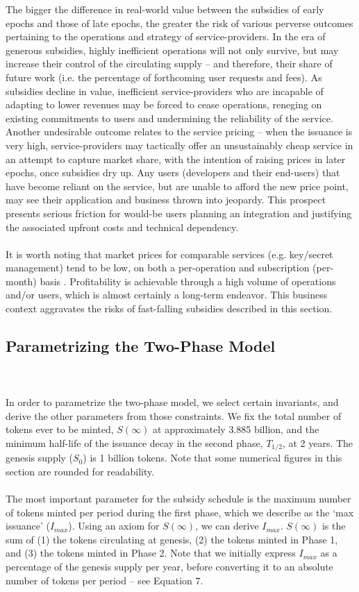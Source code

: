 \documentclass[longbibliography,nofootinbib]{revtex4-1}
\begin{document}
The bigger the difference in real-world value between the subsidies of early epochs and those of late epochs, the greater the risk of various perverse outcomes pertaining to the operations and strategy of service-providers. In the era of generous subsidies, highly inefficient operations will not only survive, but may increase their control of the circulating supply – and therefore, their share of future work (i.e. the percentage of forthcoming user requests and fees). As subsidies decline in value, inefficient service-providers who are incapable of adapting to lower revenues may be forced to cease operations, reneging on existing commitments to users and undermining the reliability of the service. Another undesirable outcome relates to the service pricing – when the issuance is very high, service-providers may tactically offer an unsustainably cheap service in an attempt to capture market share, with the intention of raising prices in later epochs, once subsidies dry up. Any users (developers and their end-users) that have become reliant on the service, but are unable to afford the new price point, may see their application and business thrown into jeopardy. This prospect presents serious friction for would-be users planning an integration and justifying the associated upfront costs and technical dependency.
\\\\
It is worth noting that market prices for comparable services (e.g. key/secret management) tend to be low, on both a per-operation and subscription (per-month) basis \cite{Pricing:AWS}\cite{Pricing:GC}\cite{Pricing:MS}. Profitability is achievable through a high volume of operations and/or users, which is almost certainly a long-term endeavor. This business context aggravates the risks of fast-falling subsidies described in this section. 

\subsection{Parametrizing the Two-Phase Model}

\\\\
In order to parametrize the two-phase model, we select certain invariants, and derive the other parameters from those constraints. We fix the total number of tokens ever to be minted, $S(\infty)$ at approximately 3.885 billion, and the minimum half-life of the issuance decay in the second phase, $T_{1/2}$, at 2 years. The genesis supply ($S_0$) is 1 billion tokens. Note that some numerical figures in this section are rounded for readability.
\\\\
The most important parameter for the subsidy schedule is the maximum number of tokens minted per period during the first phase, which we describe as the `max issuance' ($I_{max}$). Using an axiom for $S(\infty)$, we can derive $I_{max}$. $S(\infty)$ is the sum of (1) the tokens circulating at genesis, (2) the tokens minted in Phase 1, and (3) the tokens minted in Phase 2. Note that we initially express $I_{max}$ as a percentage of the genesis supply per year, before converting it to an absolute number of tokens per period – see Equation 7.
\end{document}
